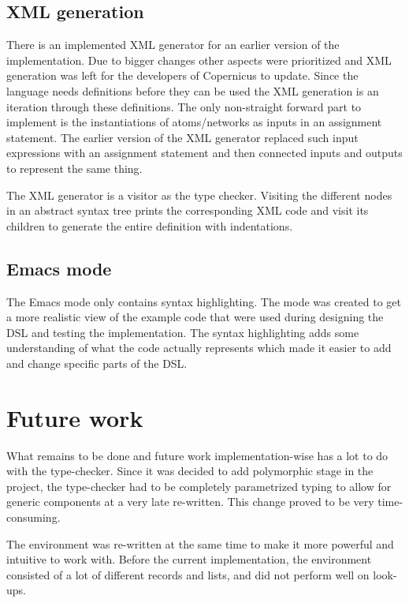 \subsection{XML generation}\label{sec:xml}
There is an implemented XML generator for an earlier version of the
implementation. Due to bigger changes other aspects were prioritized
and XML generation was left for the developers of Copernicus to
update. Since the language needs definitions before they can be used
the XML generation is an iteration through these definitions. The only
non-straight forward part to implement is the instantiations of
atoms/networks as inputs in an assignment statement. The earlier
version of the XML generator replaced such input expressions with an
assignment statement and then connected inputs and outputs to
represent the same thing.

The XML generator is a visitor as the type checker. Visiting the
different nodes in an abstract syntax tree prints the corresponding
XML code and visit its children to generate the entire definition with
indentations.

\subsection{Emacs mode}\label{sec:emacs}
The Emacs mode only contains syntax highlighting. The mode was created
to get a more realistic view of the example code that were used during
designing the DSL and testing the implementation. The syntax
highlighting adds some understanding of what the code actually
represents which made it easier to add and change specific parts of
the DSL.

\section{Future work}
What remains to be done and future work implementation-wise has a lot
to do with the type-checker. Since it was decided to add polymorphic
stage in the project, the type-checker had to be completely
parametrized typing to allow for generic components at a very late
re-written. This change proved to be very time-consuming.

The environment was re-written at the same time to make it more
powerful and intuitive to work with. Before the current
implementation, the environment consisted of a lot of different
records and lists, and did not perform well on look-ups.
